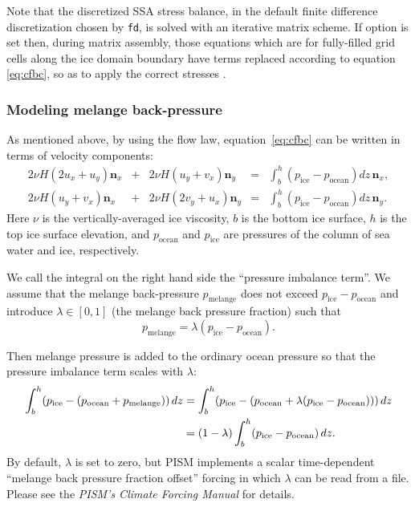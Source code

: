 Note that the discretized SSA stress balance, in the default finite difference discretization chosen by  \texttt{fd}, is solved with an iterative matrix scheme.  If option  is set then, during matrix assembly, those equations which are for fully-filled grid cells along the ice domain boundary have terms replaced according to equation \eqref{eq:cfbc}, so as to apply the correct stresses \cite{Albrechtetal2011,Winkelmannetal2011}.

\subsubsection{Modeling melange back-pressure}
\label{sec:model-melange-pressure}

As mentioned above, by using the flow law, equation~\eqref{eq:cfbc} can be written in terms of velocity components:
\newcommand{\psw}{p_{\text{ocean}}}
\newcommand{\pice}{p_{\text{ice}}}
\newcommand{\pmelange}{p_{\text{melange}}}
\newcommand{\n}{\mathbf{n}}
\newcommand{\nx}{\n_{x}}
\newcommand{\ny}{\n_{y}}
\begin{equation}
  \label{eq:cfbc-uv}
  \begin{array}{lclcl}
    2 \nu H (2u_x + u_y) \nx &+& 2 \nu H (u_y + v_x)  \ny &=& \displaystyle \int_{b}^{h}(\pice - \psw) dz\, \nx,\\
    2 \nu H (u_y + v_x)  \nx &+& 2 \nu H (2v_y + u_x) \ny &=& \displaystyle \int_{b}^{h}(\pice - \psw) dz\, \ny.
  \end{array}
\end{equation}
Here $\nu$ is the vertically-averaged ice viscosity, $b$ is the bottom ice surface, $h$ is the top ice surface elevation, and $\psw$ and $\pice$ are pressures of the column of sea water and ice, respectively.

We call the integral on the right hand side the ``pressure imbalance term''. We assume that the melange back-pressure $\pmelange$ does not exceed $\pice - \psw$ and introduce $\lambda \in [0,1]$ (the melange back pressure fraction) such that
\begin{equation*}
  \pmelange = \lambda (\pice - \psw).
\end{equation*}

Then melange pressure is added to the ordinary ocean pressure so that the pressure imbalance term scales with $\lambda$:
\begin{align}
\int_{b}^{h}(\pice - (\psw + \pmelange))\, dz &= \int_{b}^{h}(\pice - (\psw + \lambda(\pice - \psw)))\, dz \notag \\
&= (1 - \lambda) \int_{b}^{h} (\pice - \psw)\, dz.  \label{eq:cfbc-3}
\end{align}
By default, $\lambda$ is set to zero, but PISM implements a scalar time-dependent ``melange back pressure fraction offset'' forcing in which $\lambda$ can be read from a file.  Please see the \emph{PISM's Climate Forcing Manual} for details.

